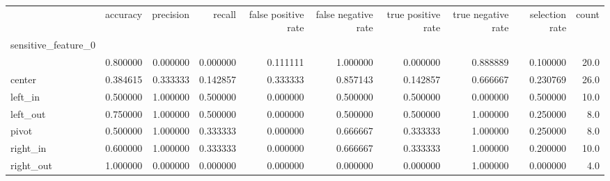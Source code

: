 \begin{tabular}{lrrrrrrrrr}
\toprule
{} &  accuracy &  precision &    recall &  false positive rate &  false negative rate &  true positive rate &  true negative rate &  selection rate &  count \\
sensitive\_feature\_0 &           &            &           &                      &                      &                     &                     &                 &        \\
\midrule
                    &  0.800000 &   0.000000 &  0.000000 &             0.111111 &             1.000000 &            0.000000 &            0.888889 &        0.100000 &   20.0 \\
center              &  0.384615 &   0.333333 &  0.142857 &             0.333333 &             0.857143 &            0.142857 &            0.666667 &        0.230769 &   26.0 \\
left\_in             &  0.500000 &   1.000000 &  0.500000 &             0.000000 &             0.500000 &            0.500000 &            0.000000 &        0.500000 &   10.0 \\
left\_out            &  0.750000 &   1.000000 &  0.500000 &             0.000000 &             0.500000 &            0.500000 &            1.000000 &        0.250000 &    8.0 \\
pivot               &  0.500000 &   1.000000 &  0.333333 &             0.000000 &             0.666667 &            0.333333 &            1.000000 &        0.250000 &    8.0 \\
right\_in            &  0.600000 &   1.000000 &  0.333333 &             0.000000 &             0.666667 &            0.333333 &            1.000000 &        0.200000 &   10.0 \\
right\_out           &  1.000000 &   0.000000 &  0.000000 &             0.000000 &             0.000000 &            0.000000 &            1.000000 &        0.000000 &    4.0 \\
\bottomrule
\end{tabular}
